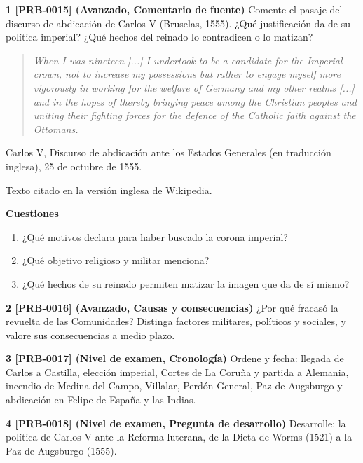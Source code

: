 \documentclass{book}
\begin{document}
\begin{tcolorbox}[title={Ejercicios}, studiumworked, breakable]

\noindent\textbf{1 [PRB-0015] (Avanzado, Comentario de fuente)}
Comente el pasaje del discurso de abdicación de Carlos V (Bruselas, 1555). ¿Qué justificación da de su política imperial? ¿Qué hechos del reinado lo contradicen o lo matizan?


\begin{quote}
\itshape When I was nineteen [...] I undertook to be a candidate for the Imperial crown, not to increase my possessions but rather to engage myself more vigorously in working for the welfare of Germany and my other realms [...] and in the hopes of thereby bringing peace among the Christian peoples and uniting their fighting forces for the defence of the Catholic faith against the Ottomans.
\end{quote}
{\noindent\footnotesize Carlos V, Discurso de abdicación ante los Estados Generales (en traducción inglesa), 25 de octubre de 1555.\par}
{\noindent\footnotesize Texto citado en la versión inglesa de Wikipedia.\par}

\noindent\textbf{Cuestiones}
\begin{enumerate}
\item ¿Qué motivos declara para haber buscado la corona imperial?
\item ¿Qué objetivo religioso y militar menciona?
\item ¿Qué hechos de su reinado permiten matizar la imagen que da de sí mismo?
\end{enumerate}

\noindent\textbf{2 [PRB-0016] (Avanzado, Causas y consecuencias)}
¿Por qué fracasó la revuelta de las Comunidades? Distinga factores militares, políticos y sociales, y valore sus consecuencias a medio plazo.


\noindent\textbf{3 [PRB-0017] (Nivel de examen, Cronología)}
Ordene y fecha: llegada de Carlos a Castilla, elección imperial, Cortes de La Coruña y partida a Alemania, incendio de Medina del Campo, Villalar, Perdón General, Paz de Augsburgo y abdicación en Felipe de España y las Indias.


\noindent\textbf{4 [PRB-0018] (Nivel de examen, Pregunta de desarrollo)}
Desarrolle: la política de Carlos V ante la Reforma luterana, de la Dieta de Worms (1521) a la Paz de Augsburgo (1555).

\end{tcolorbox}
\end{document}
